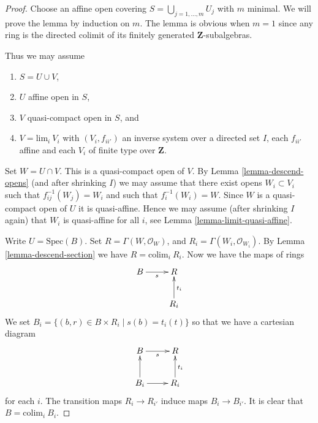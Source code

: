 \begin{proof}
Choose an affine open covering $S = \bigcup_{j = 1, \ldots, m} U_j$
with $m$ minimal. We will prove the lemma by induction on $m$.
The lemma is obvious when $m = 1$ since any ring is the
directed colimit of its finitely generated $\mathbf{Z}$-subalgebras.

\medskip\noindent
Thus we may assume
\begin{enumerate}
\item $S = U \cup V$,
\item $U$ affine open in $S$,
\item $V$ quasi-compact open in $S$, and
\item $V = \text{lim}_i\ V_i$ with $(V_i, f_{ii'})$
an inverse system over a directed set $I$, each $f_{ii'}$
affine and each $V_i$ of finite type over $\mathbf{Z}$.
\end{enumerate}
Set $W = U \cap V$. This is a quasi-compact open of $V$.
By Lemma \ref{lemma-descend-opens}
(and after shrinking $I$) we may assume that there exist
opens $W_i \subset V_i$ such that $f_{ij}^{-1}(W_j) = W_i$
and such that $f_i^{-1}(W_i) = W$. Since $W$ is a quasi-compact open
of $U$ it is quasi-affine. Hence we may assume (after shrinking $I$ again)
that $W_i$ is quasi-affine for all $i$, see
Lemma \ref{lemma-limit-quasi-affine}.

\medskip\noindent
Write $U = \text{Spec}(B)$. Set $R = \Gamma(W, \mathcal{O}_W)$,
and $R_i = \Gamma(W_i, \mathcal{O}_{W_i})$.
By Lemma \ref{lemma-descend-section} we have $R = \text{colim}_i\ R_i$.
Now we have the maps of rings
$$
\xymatrix{
B \ar[r]_s & R \\
& R_i \ar[u]_{t_i}
}
$$
We set $B_i = \{(b, r) \in B \times R_i \mid s(b) = t_i(t)\}$ so that we
have a cartesian diagram
$$
\xymatrix{
B \ar[r]_s & R \\
B_i \ar[u] \ar[r] & R_i \ar[u]_{t_i}
}
$$
for each $i$. The transition maps $R_i \to R_{i'}$ induce maps
$B_i \to B_{i'}$. It is clear that $B = \text{colim}_i\ B_i$.


\end{proof}
